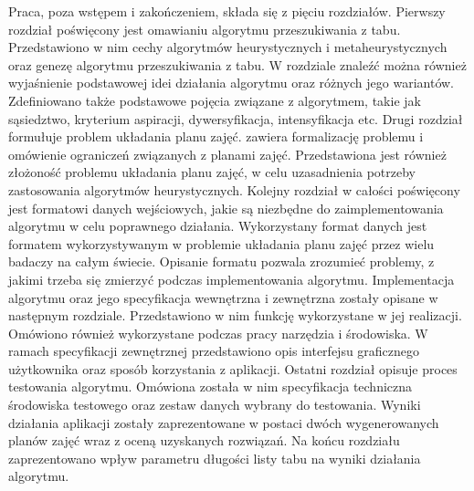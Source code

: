 Praca, poza wstępem i zakończeniem, składa się z pięciu rozdziałów. Pierwszy rozdział poświęcony jest omawianiu algorytmu przeszukiwania z tabu. Przedstawiono w nim cechy algorytmów heurystycznych i metaheurystycznych oraz genezę algorytmu przeszukiwania z tabu. W rozdziale znaleźć można również wyjaśnienie podstawowej idei działania algorytmu oraz różnych jego wariantów. Zdefiniowano także podstawowe pojęcia związane z algorytmem, takie jak sąsiedztwo, kryterium aspiracji, dywersyfikacja, intensyfikacja etc. Drugi rozdział formułuje problem układania planu zajęć. zawiera formalizację problemu i omówienie ograniczeń związanych z planami zajęć. Przedstawiona jest również złożoność problemu układania planu zajęć, w celu uzasadnienia potrzeby zastosowania algorytmów heurystycznych. Kolejny rozdział w całości poświęcony jest formatowi danych wejściowych, jakie są niezbędne do zaimplementowania algorytmu w celu poprawnego działania. Wykorzystany format danych jest formatem wykorzystywanym w problemie układania planu zajęć przez wielu badaczy na całym świecie. Opisanie formatu pozwala zrozumieć problemy, z jakimi trzeba się zmierzyć podczas implementowania algorytmu. Implementacja algorytmu oraz jego specyfikacja wewnętrzna i zewnętrzna zostały opisane w następnym rozdziale. Przedstawiono w nim funkcję wykorzystane w jej realizacji. Omówiono również wykorzystane podczas pracy narzędzia i środowiska. W ramach specyfikacji zewnętrznej przedstawiono opis interfejsu graficznego użytkownika oraz sposób korzystania z aplikacji. Ostatni rozdział opisuje proces testowania algorytmu. Omówiona została w nim specyfikacja techniczna środowiska testowego oraz zestaw danych wybrany do testowania. Wyniki działania aplikacji zostały zaprezentowane w postaci dwóch wygenerowanych planów zajęć wraz z oceną uzyskanych rozwiązań. Na końcu rozdziału zaprezentowano wpływ parametru długości listy tabu na wyniki działania algorytmu.
